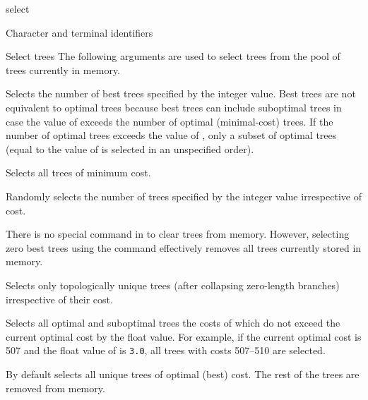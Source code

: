 \begin{command}{select}{}
\begin{arguments}
\begin{argumentgroup}{Character and terminal identifiers}
                \end{argumentgroup}

		\begin{argumentgroup}{Select trees}
			{The following arguments are used to select trees from the pool of trees currently in memory.}

		{Selects the number of best trees specified by the integer value.
		Best trees are not equivalent to optimal trees because best trees
		can include suboptimal trees in case the value of
		 exceeds the number of optimal (minimal-cost)
		trees. If the number of optimal trees exceeds the value of
		, only a subset of optimal trees (equal to the
		value of  is selected in an unspecified order).} 
                	{}

		{Selects all trees of minimum cost.} 
                	{}
			
		{Randomly selects the number of trees specified by the integer
		value irrespective of cost.} 
                {}

         		\begin{statement}
               There is no special command in \poy to clear trees from memory. However,
               selecting zero best trees using the command 
               effectively removes all trees currently stored in memory.
       		   \end{statement}
            
		{Selects only topologically unique trees (after collapsing zero-length
		branches) irrespective of their cost.} 
                {}

                {Selects all optimal and suboptimal trees the costs of which do not exceed
                the current optimal cost by the float value. For example, if the current
                optimal cost is 507 and the float value of  is
                \texttt{3.0}, all trees with costs 507--510 are selected.} 
                {}

    		\end{argumentgroup}
	
	\end{arguments}
	 	 	 	 	  
        {By default \poy selects all unique trees of optimal (best) cost. The rest of
        the trees are removed from memory.}


\end{command}
